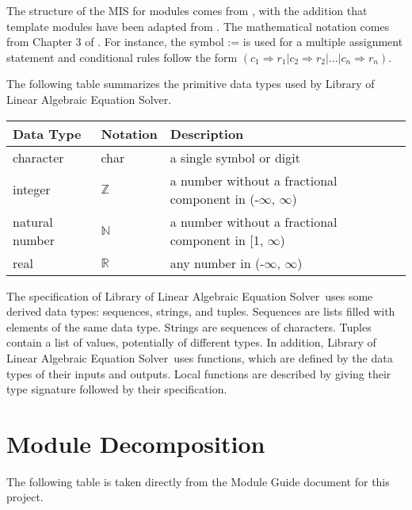 \documentclass[12pt, titlepage]{article}
\newcommand{\progname}{Library of Linear Algebraic Equation Solver}
\begin{document}

The structure of the MIS for modules comes from \cite{hoffman1999software},
with the addition that template modules have been adapted from
\cite{ghezzi2002fundamentals}.  The mathematical notation comes from Chapter 3 of
\cite{hoffman1999software}.  For instance, the symbol := is used for a
multiple assignment statement and conditional rules follow the form $(c_1
\Rightarrow r_1 | c_2 \Rightarrow r_2 | ... | c_n \Rightarrow r_n )$.

The following table summarizes the primitive data types used by \progname. 

\begin{center}
\renewcommand{\arraystretch}{1.2}
\noindent 
\begin{tabular}{l l p{7.5cm}} 
\toprule 
\textbf{Data Type} & \textbf{Notation} & \textbf{Description}\\ 
\midrule
character & char & a single symbol or digit\\
integer & $\mathbb{Z}$ & a number without a fractional component in (-$\infty$, $\infty$) \\
natural number & $\mathbb{N}$ & a number without a fractional component in [1, $\infty$) \\
real & $\mathbb{R}$ & any number in (-$\infty$, $\infty$)\\
\bottomrule
\end{tabular} 
\end{center}

\noindent
The specification of \progname \ uses some derived data types: sequences, strings, and
tuples. Sequences are lists filled with elements of the same data type. Strings
are sequences of characters. Tuples contain a list of values, potentially of
different types. In addition, \progname \ uses functions, which
are defined by the data types of their inputs and outputs. Local functions are
described by giving their type signature followed by their specification.

\section{Module Decomposition}

The following table is taken directly from the Module Guide document for this project.
\end{document}
